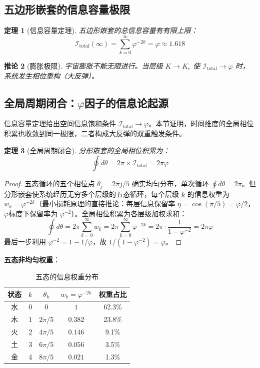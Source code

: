 \documentclass[12pt,a4paper,twocolumn]{article}
\renewcommand{\phi}{\varphi}
\newtheorem{theorem}{定理}[section]
\newtheorem{corollary}[theorem]{推论}
\begin{document}
\subsection{五边形嵌套的信息容量极限}

\begin{theorem}[信息容量定理]
五边形嵌套的总信息容量有有限上限：
\begin{equation}
\mathcal{I}_{\text{total}}(\infty) = \sum_{k=0}^{\infty}\phi^{-2k} = \phi \approx 1.618
\end{equation}
\end{theorem}

\begin{corollary}[膨胀极限]
宇宙膨胀不能无限进行。当层级 $K \to K_c$ 使 $\mathcal{I}_{\text{total}} \to \phi$ 时，系统发生相位重构（大反弹）。
\end{corollary}

\subsection{全局周期闭合：$\phi$因子的信息论起源}
\label{subsec:phase_closure}

信息容量定理给出空间信息饱和条件 $\mathcal{I}_{\text{total}} \to \phi$。本节证明，时间维度的全局相位积累也收敛到同一极限，二者构成大反弹的双重触发条件。

\begin{theorem}[全局周期闭合]
\label{thm:phase_closure}
分形嵌套的全局相位积累为：
\begin{equation}
\oint d\theta = 2\pi \times \mathcal{I}_{\text{total}} = 2\pi\phi
\end{equation}
\end{theorem}

\begin{proof}
五态循环的五个相位点 $\theta_j = 2\pi j/5$ 确实均匀分布，单次循环 $\oint d\theta = 2\pi$。但分形嵌套使系统经历无穷多个层级的五态循环，每个层级 $k$ 的信息权重为 $w_k = \phi^{-2k}$（最小损耗原理的直接推论：每层信息保留率 $\eta = \cos(\pi/5) = \phi/2$，$\phi$标度下保留率为 $\phi^{-2}$）。全局相位积累为各层级加权求和：
\[
\oint d\theta = 2\pi \sum_{k=0}^{\infty} w_k = 2\pi \sum_{k=0}^{\infty} \phi^{-2k} = 2\pi \cdot \frac{1}{1-\phi^{-2}} = 2\pi\phi
\]
最后一步利用 $\phi^{-2} = 1 - 1/\phi$，故 $1/(1-\phi^{-2}) = \phi$。
\end{proof}

\textbf{五态非均匀权重}：

\begin{table}[H]
\centering
\caption{五态的信息权重分布}
\label{tab:five_state_weights}
\begin{tabular}{c|c|c|c|c}
\hline
状态 & $k$ & $\theta_k$ & $w_k = \phi^{-2k}$ & 权重占比 \\
\hline
水 & 0 & $0$ & $1$ & 62.3\% \\
木 & 1 & $2\pi/5$ & $0.382$ & 23.8\% \\
火 & 2 & $4\pi/5$ & $0.146$ & 9.1\% \\
土 & 3 & $6\pi/5$ & $0.056$ & 3.5\% \\
金 & 4 & $8\pi/5$ & $0.021$ & 1.3\% \\
\hline
\end{tabular}
\end{table}
\end{document}
